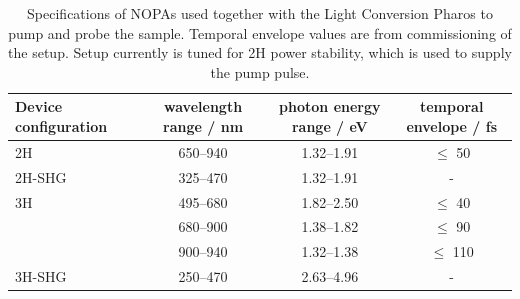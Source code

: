 \documentclass[twoside,openright]{scrreprt}
\begin{document}
\begin{table}
\caption{Specifications of NOPAs used together with the Light Conversion Pharos to pump and probe the sample. Temporal envelope values are from commissioning of the setup. Setup currently is tuned for 2H power stability, which is used to supply the pump pulse.\label{tab:NOPAs}}
\begin{tabular}{lccc}\toprule
Device configuration & wavelength range / nm & photon energy range / eV & temporal envelope / fs \\ \midrule
2H & \SIrange{650}{940}{} & \SIrange{1.32}{1.91}{} & $\leq$ 50 \\ 
2H-SHG & \SIrange{325}{470}{} & \SIrange{1.32}{1.91}{} & - \\\midrule
3H & \SIrange{495}{680}{} & \SIrange{1.82}{2.50}{} & $\leq$ 40 \\
& \SIrange{680}{900}{} & \SIrange{1.38}{1.82}{} & $\leq$ 90 \\
& \SIrange{900}{940}{} & \SIrange{1.32}{1.38}{} & $\leq$ 110 \\
3H-SHG& \SIrange{250}{470}{} & \SIrange{2.63}{4.96}{} & - \\
\end{tabular}
\end{table}
\end{document}
